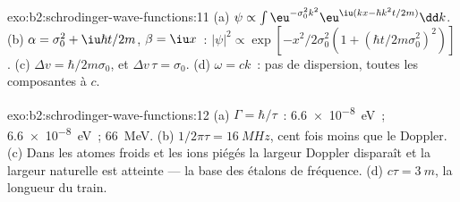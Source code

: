 \begin{solution}{exo:b2:schrodinger-wave-functions:11}
(a) $\psi \propto \int\eu^{-\sigma_0^2k^2}\eu^{\iu(kx - \hbar k^2t/2m)}\dd k$. (b) $\alpha =
\sigma_0^2 + \iu\hbar t/2m$, $\beta = \iu x$~: $|\psi|^2 \propto \exp[-x^2/2\sigma_0^2(1 +
(\hbar t/2m\sigma_0^2)^2)]$. (c) $\Delta v = \hbar/2m\sigma_0$, et $\Delta v\,\tau =
\sigma_0$. (d) $\omega = ck$~: pas de dispersion, toutes les composantes à $c$.
\end{solution}

\begin{solution}{exo:b2:schrodinger-wave-functions:12}
(a) $\Gamma = \hbar/\tau$~: \qty{6.6e-8}{eV}~; \qty{6.6e-8}{eV}~; \qty{66}{MeV}. (b)
$1/2\pi\tau = \qty{16}{MHz}$, cent fois moins que le Doppler. (c) Dans
les atomes froids et les ions piégés la largeur Doppler disparaît et la largeur
naturelle est atteinte --- la base des étalons de fréquence. (d) $c\tau =
\qty{3}{m}$, la longueur du train.
\end{solution}

